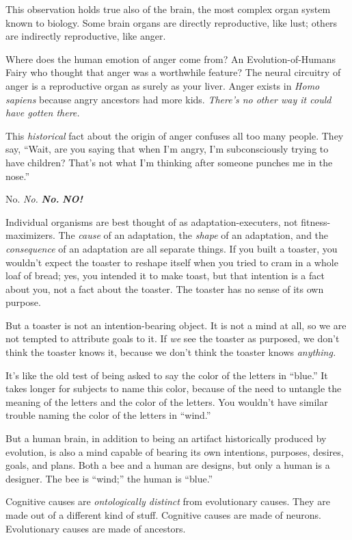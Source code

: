 {
 This observation holds true also of the brain, the most complex
organ system known to biology. Some brain organs are directly
reproductive, like lust; others are indirectly reproductive, like
anger.}

{
 Where does the human emotion of anger come from? An
Evolution-of-Humans Fairy who thought that anger was a worthwhile
feature? The neural circuitry of anger is a reproductive organ as
surely as your liver. Anger exists in \textit{Homo sapiens} because
angry ancestors had more kids. \textit{There's no other
way it could have gotten there.}}

{
 This \textit{historical} fact about the origin of anger confuses
all too many people. They say, ``Wait, are you saying
that when I'm angry, I'm subconsciously
trying to have children? That's not what
I'm thinking after someone punches me in the
nose.''}

{
 No. \textit{No.} \textbf{\textit{No.}} \textbf{\textit{NO!}}}

{
 Individual organisms are best thought of as adaptation-executers,
not fitness-maximizers. The \textit{cause} of an adaptation, the
\textit{shape} of an adaptation, and the \textit{consequence} of an
adaptation are all separate things. If you built a toaster, you
wouldn't expect the toaster to reshape itself when you
tried to cram in a whole loaf of bread; yes, you intended it to make
toast, but that intention is a fact about you, not a fact about the
toaster. The toaster has no sense of its own purpose.}

{
 But a toaster is not an intention-bearing object. It is not a mind
at all, so we are not tempted to attribute goals to it. If \textit{we}
see the toaster as purposed, we don't think the toaster
knows it, because we don't think the toaster knows
\textit{anything.}}

{
 It's like the old test of being asked to say the
color of the letters in ``blue.'' It
takes longer for subjects to name this color, because of the need to
untangle the meaning of the letters and the color of the letters. You
wouldn't have similar trouble naming the color of the
letters in ``wind.''}

{
 But a human brain, in addition to being an artifact historically
produced by evolution, is also a mind capable of bearing its own
intentions, purposes, desires, goals, and plans. Both a bee and a human
are designs, but only a human is a designer. The bee is
``wind;'' the human is
``blue.''}

{
 Cognitive causes are \textit{ontologically distinct} from
evolutionary causes. They are made out of a different kind of stuff.
Cognitive causes are made of neurons. Evolutionary causes are made of
ancestors.}

